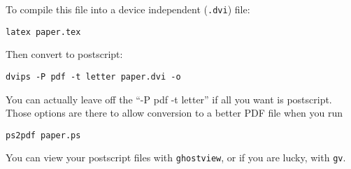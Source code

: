 \documentclass[12pt]{article}
\begin{document}
To compile this file into a device independent ({\tt .dvi}) file:

\begin{verbatim}
latex paper.tex
\end{verbatim}

Then convert to postscript:

\begin{verbatim}
dvips -P pdf -t letter paper.dvi -o
\end{verbatim}

You can actually leave off the ``-P pdf -t letter'' if all you want is
postscript.  Those options are there to allow conversion to a better
PDF file when you run

\begin{verbatim}
ps2pdf paper.ps
\end{verbatim}

You can view your postscript files with {\tt ghostview}, or if you
are lucky, with {\tt gv}.

\end{document}
